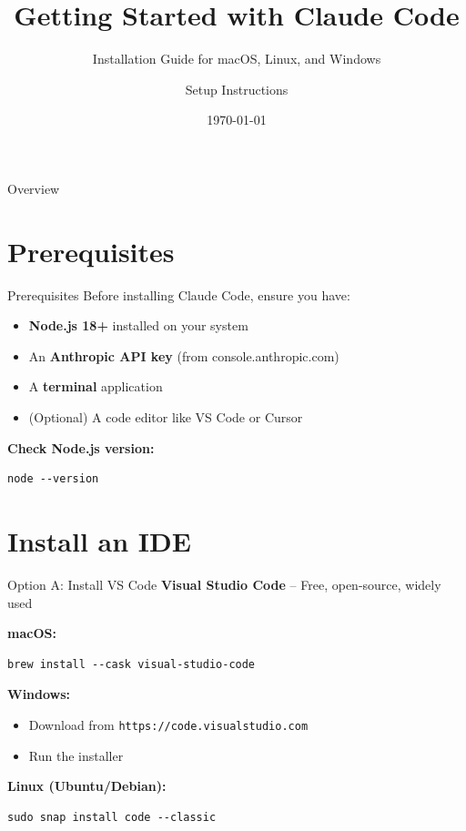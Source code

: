 \documentclass{beamer}
\title{Getting Started with Claude Code}
\subtitle{Installation Guide for macOS, Linux, and Windows}
\author{Setup Instructions}
\date{\today}
\begin{document}
\begin{frame}
    \titlepage
\end{frame}

\begin{frame}{Overview}
    \tableofcontents
\end{frame}

\section{Prerequisites}

\begin{frame}[fragile]{Prerequisites}
    Before installing Claude Code, ensure you have:
    \vspace{0.5cm}
    \begin{itemize}
        \item \textbf{Node.js 18+} installed on your system
        \item An \textbf{Anthropic API key} (from console.anthropic.com)
        \item A \textbf{terminal} application
        \item (Optional) A code editor like VS Code or Cursor
    \end{itemize}
    \vspace{0.5cm}
    \textbf{Check Node.js version:}
\begin{lstlisting}
node --version
\end{lstlisting}
\end{frame}

\section{Install an IDE}

\begin{frame}[fragile]{Option A: Install VS Code}
    \textbf{Visual Studio Code} -- Free, open-source, widely used
    \vspace{0.3cm}

    \textbf{macOS:}
\begin{lstlisting}
brew install --cask visual-studio-code
\end{lstlisting}

    \textbf{Windows:}
    \begin{itemize}
        \item Download from \texttt{https://code.visualstudio.com}
        \item Run the installer
    \end{itemize}

    \textbf{Linux (Ubuntu/Debian):}
\begin{lstlisting}
sudo snap install code --classic
\end{lstlisting}
\end{frame}
\end{document}
